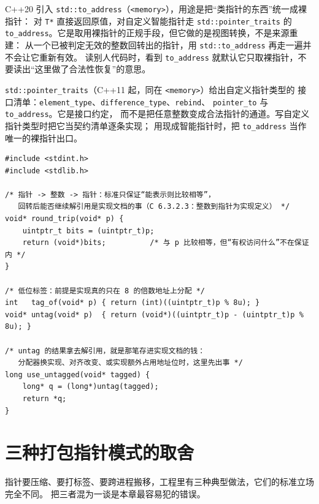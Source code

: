\documentclass[12pt,a4paper,fontset=fandol]{ctexbook}
\newcommand{\cpp}[1]{C++#1}
\newcommand{\Tp}[1]{\texttt{#1}}
\newcommand{\Bk}{\discretionary{}{}{}}
\newcommand{\Hdr}[1]{\texttt{<#1>}}
\begin{document}
\cpp{20} 引入 \Tp{std::to\_address}（\Hdr{memory}），用途是把“类指针的东西”统一成裸指针：
对 \Tp{T*} 直接返回原值，对自定义智能指针走 \Tp{std::pointer{\Bk}\_traits} 的
\Tp{to\_address}。它是取用裸指针的正规手段，但它做的是视图转换，不是来源重建：
从一个已被判定无效的整数回转出的指针，用 \Tp{std::to\_address} 再走一遍并不会让它重新有效。
读别人代码时，看到 \Tp{to\_address} 就默认它只取裸指针，不要读出“这里做了合法性恢复”的意思。

\Tp{std::pointer{\Bk}\_traits}（\cpp{11} 起，同在 \Hdr{memory}）给出自定义指针类型的
接口清单：\Tp{element{\Bk}\_type}、\Tp{difference{\Bk}\_type}、\Tp{rebind}、
\Tp{pointer{\Bk}\_to} 与 \Tp{to{\Bk}\_address}。它是接口约定，
而不是把任意整数变成合法指针的通道。写自定义指针类型时把它当契约清单逐条实现；
用现成智能指针时，把 \Tp{to{\Bk}\_address} 当作唯一的裸指针出口。

\begin{lstlisting}[style=cstyle, caption={整数往返与低位标签的最小形态}]
#include <stdint.h>
#include <stdlib.h>

/* 指针 -> 整数 -> 指针：标准只保证“能表示则比较相等”，
   回转后能否继续解引用是实现文档的事（C 6.3.2.3：整数到指针为实现定义） */
void* round_trip(void* p) {
    uintptr_t bits = (uintptr_t)p;
    return (void*)bits;          /* 与 p 比较相等，但“有权访问什么”不在保证内 */
}

/* 低位标签：前提是实现真的只在 8 的倍数地址上分配 */
int   tag_of(void* p) { return (int)((uintptr_t)p % 8u); }
void* untag(void* p)  { return (void*)((uintptr_t)p - (uintptr_t)p % 8u); }

/* untag 的结果拿去解引用，就是那笔存进实现文档的钱：
   分配器换实现、对齐改变、或实现额外占用地址位时，这里先出事 */
long use_untagged(void* tagged) {
    long* q = (long*)untag(tagged);
    return *q;
}
\end{lstlisting}

\section{三种打包指针模式的取舍}\label{sec:ub05-packed}

指针要压缩、要打标签、要跨进程搬移，工程里有三种典型做法，它们的标准立场完全不同。
把三者混为一谈是本章最容易犯的错误。
\end{document}
